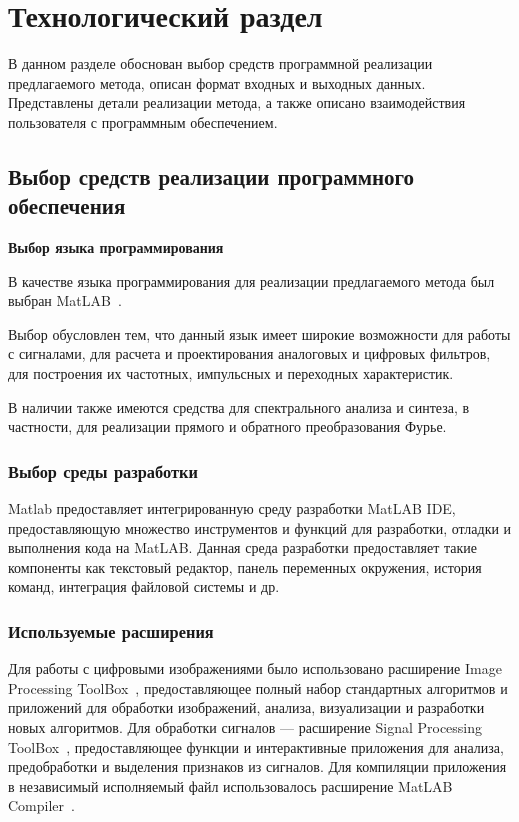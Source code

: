 \chapter{Технологический раздел}

В данном разделе обоснован выбор средств программной реализации предлагаемого метода, описан формат входных и выходных данных. Представлены детали реализации метода, а также описано взаимодействия пользователя с программным обеспечением.

\section{Выбор средств реализации программного обеспечения}

\textbf{Выбор языка программирования}

В качестве языка программирования для реализации предлагаемого метода был выбран MatLAB~\cite{matlab_doc}. 

Выбор обусловлен тем, что данный язык имеет широкие возможности для работы с сигналами, для расчета и проектирования аналоговых и цифровых фильтров, для построения их частотных, импульсных и переходных характеристик. 

В наличии также имеются средства для спектрального анализа и синтеза, в частности, для реализации прямого и обратного преобразования Фурье.~\cite{matlab}

\subsection{Выбор среды разработки}

Matlab предоставляет интегрированную среду разработки MatLAB IDE, предоставляющую множество инструментов и функций для разработки, отладки и выполнения кода на MatLAB. Данная среда разработки предоставляет такие компоненты как текстовый редактор, панель переменных окружения, история команд, интеграция файловой системы и др.

\subsection{Используемые расширения}

Для работы с цифровыми изображениями было использовано расширение Image Processing ToolBox~\cite{image_toolbox}, предоставляющее полный набор стандартных алгоритмов и приложений для обработки изображений, анализа, визуализации и разработки новых алгоритмов. Для обработки сигналов --- расширение Signal Processing ToolBox~\cite{signal_toolbox}, предоставляющее функции и интерактивные приложения для анализа, предобработки и выделения признаков из сигналов. Для компиляции приложения в независимый исполняемый файл использовалось расширение MatLAB Compiler~\cite{compiler}.

